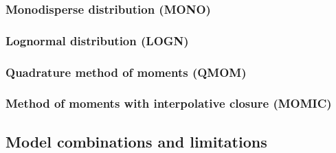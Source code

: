 \documentclass[preprint,12pt,letterpaper]{elsarticle}
\begin{document}
\begin{table}
    \caption{Summary of soot particle size distribution models implemented in SootLib.}
    \label{t:psd_models}
    \centering
\end{table}

\subsubsection{Monodisperse distribution (MONO)}
\label{sss:mono}

\subsubsection{Lognormal distribution (LOGN)}
\label{sss:logn}

\subsubsection{Quadrature method of moments (QMOM)}
\label{sss:qmom}

\subsubsection{Method of moments with interpolative closure (MOMIC)}
\label{sss:momic}


\subsection{Model combinations and limitations}
\label{ss:limitations}
\end{document}
